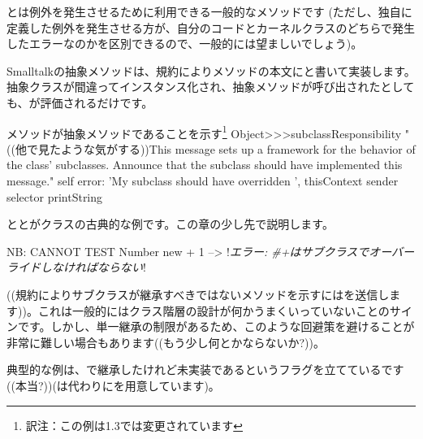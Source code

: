 \documentclass[a4paper,10pt,twoside]{book}
\begin{document}

とは例外を発生させるために利用できる一般的なメソッドです
(ただし、独自に定義した例外を発生させる方が、自分のコードとカーネルクラスのどちらで発生したエラーなのかを区別できるので、一般的には望ましいでしょう)。

Smalltalkの抽象メソッドは、規約によりメソッドの本文にと書いて実装します。抽象クラスが間違ってインスタンス化され、抽象メソッドが呼び出されたとしても、が評価されるだけです。

\begin{method}{メソッドが抽象メソッドであることを示す\protect\footnote{訳注：この例は\pharo 1.3では変更されています}}
Object>>>subclassResponsibility
    "((他で見たような気がする))This message sets up a framework for the behavior of the class' subclasses.
    Announce that the subclass should have implemented this message."
    self error: 'My subclass should have overridden ', thisContext sender selector printString
\end{method}

ととがクラスの古典的な例です。この章の少し先で説明します。

\begin{code}{NB: CANNOT TEST}
Number new + 1 --> !\emph{エラー: \#+はサブクラスでオーバーライドしなければならない}!
\end{code}

((規約によりサブクラスが継承すべきではないメソッドを示すにはを送信します))。これは一般的にはクラス階層の設計が何かうまくいっていないことのサインです。しかし、単一継承の制限があるため、このような回避策を避けることが非常に難しい場合もあります((もう少し何とかならないか?))。

典型的な例は、で継承したけれど未実装であるというフラグを立てているです((本当?))(は代わりにを用意しています)。


\end{document}
